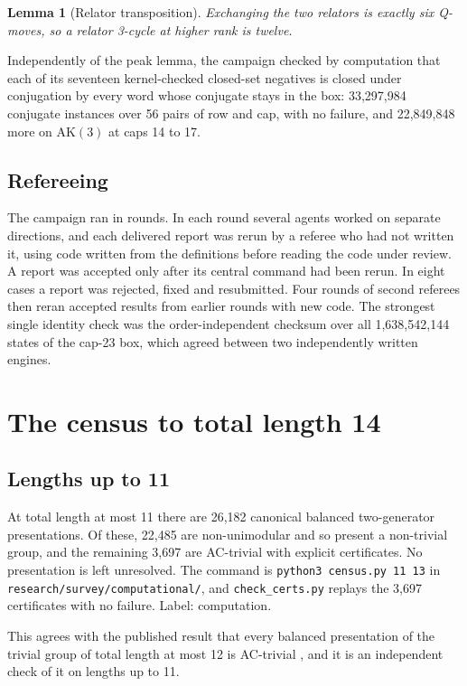 \documentclass[11pt,a4paper]{article}
\newtheorem{lemma}[theorem]{Lemma}
\theoremstyle{definition}
\newcommand{\AK}{\mathrm{AK}}
\begin{document}
\begin{lemma}[Relator transposition]
Exchanging the two relators is exactly six Q-moves, so a relator 3-cycle at higher rank is twelve.
\end{lemma}

Independently of the peak lemma, the campaign checked by computation that each of its seventeen kernel-checked closed-set negatives is closed under conjugation by every word whose conjugate stays in the box: 33,297,984 conjugate instances over 56 pairs of row and cap, with no failure, and 22,849,848 more on $\AK(3)$ at caps 14 to 17.

\subsection{Refereeing}

The campaign ran in rounds. In each round several agents worked on separate directions, and each delivered report was rerun by a referee who had not written it, using code written from the definitions before reading the code under review. A report was accepted only after its central command had been rerun. In eight cases a report was rejected, fixed and resubmitted. Four rounds of second referees then reran accepted results from earlier rounds with new code. The strongest single identity check was the order-independent checksum over all 1,638,542,144 states of the cap-23 box, which agreed between two independently written engines.

\section{The census to total length 14}\label{sec:census}

\subsection{Lengths up to 11}

At total length at most 11 there are 26,182 canonical balanced two-generator presentations. Of these, 22,485 are non-unimodular and so present a non-trivial group, and the remaining 3,697 are AC-trivial with explicit certificates. No presentation is left unresolved. The command is \texttt{python3 census.py 11 13} in \texttt{research/survey/computational/}, and \texttt{check\_certs.py} replays the 3,697 certificates with no failure. Label: computation.

This agrees with the published result that every balanced presentation of the trivial group of total length at most 12 is AC-trivial \cite{Mia99,HR03}, and it is an independent check of it on lengths up to 11.
\end{document}

